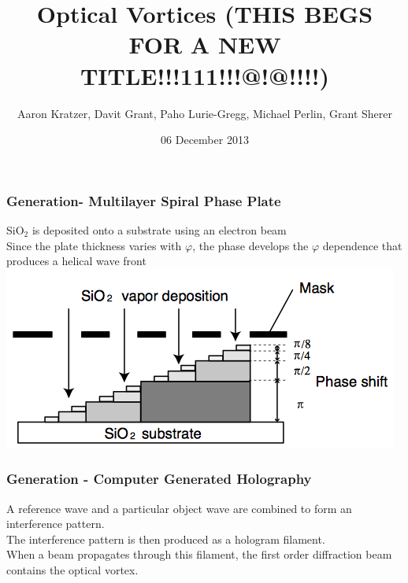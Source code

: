 \documentclass[xcolor=dvipsnames]{beamer}
\title{Optical Vortices (THIS BEGS FOR A NEW TITLE!!!111!!!@!@!!!!)}
\author{Aaron Kratzer, Davit Grant, Paho Lurie-Gregg,
  Michael Perlin, Grant Sherer}
\date{06 December 2013}
\renewcommand{\phi}{\varphi} %
\begin{document}
\begin{frame}
	\frametitle{Generation-  Multilayer Spiral Phase Plate}
	SiO$_2$ is deposited onto a substrate using an electron beam
	\\Since the plate thickness varies with $\phi$, the phase develops the $\phi$ dependence that produces a helical wave front
	\\\centering
	\includegraphics[scale=.4]{MSPP.jpg}
	\\\cite{MSPP}
\end{frame}


\begin{frame}
	\frametitle{Generation - Computer Generated Holography}
	A reference wave and a particular object wave are combined to form an interference pattern.
	\\The interference pattern is then produced as a hologram filament. 
	\\ When a beam propagates through this filament, the first order diffraction beam contains the optical vortex.
\end{frame}


\end{document}

